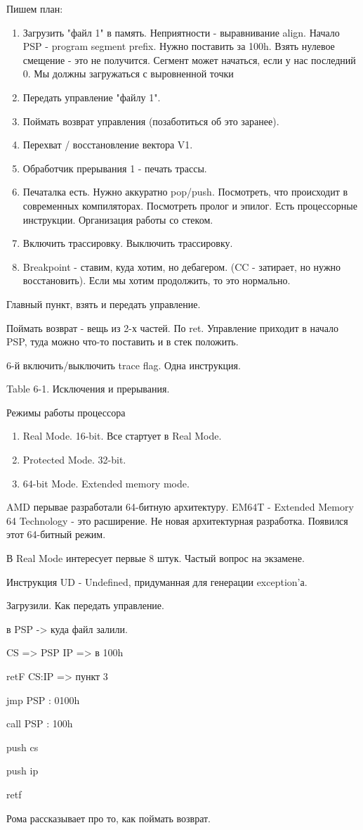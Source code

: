 Пишем план:
\begin{enumerate}
\item Загрузить "файл 1" в память. Неприятности - выравнивание align. Начало PSP - program segment prefix. Нужно поставить за 100h. Взять нулевое смещение - это не получится. Сегмент может начаться, если у нас последний 0.
Мы должны загружаться с выровненной точки
\item Передать управление "файлу 1".
\item Поймать возврат управления (позаботиться об это заранее).
\item Перехват / восстановление вектора V1.
\item Обработчик прерывания 1 - печать трассы.
\item Печаталка есть. Нужно аккуратно pop/push. Посмотреть, что происходит в современных компиляторах. Посмотреть пролог и эпилог. Есть процессорные инструкции. Организация работы со стеком.
\item Включить трассировку. Выключить трассировку.
\item Breakpoint - ставим, куда хотим, но дебагером. (CC - затирает, но нужно восстановить). Если мы хотим продолжить, то это нормально.
\end{enumerate}

Главный пункт, взять и передать управление. 




Поймать возврат - вещь из 2-х частей. По ret. Управление приходит в начало PSP, туда можно что-то поставить и в стек положить.

6-й включить/выключить trace flag. Одна инструкция.

Table 6-1. Исключения и прерывания.

Режимы работы процессора
\begin{enumerate}
\item Real Mode. 16-bit. Все стартует в Real Mode. 
\item Protected Mode. 32-bit.
\item 64-bit Mode. Extended memory mode.
\end{enumerate}

AMD перывае разработали 64-битную архитектуру. EM64T - Extended Memory 64 Technology - это расширение. Не новая архитектурная разработка. Появился этот 64-битный режим. 
\begin{rem}В Real Mode интересует первые 8 штук. Частый вопрос на экзамене.\end{rem}
Инструкция UD - Undefined, придуманная для генерации exception'а.

Загрузили. Как передать управление.

в PSP -> куда файл залили. 

CS => PSP
IP => в 100h

retF CS:IP => пункт 3

jmp PSP : 0100h

call PSP : 100h

push cs

push ip

retf


Рома рассказывает про то, как поймать возврат. 
